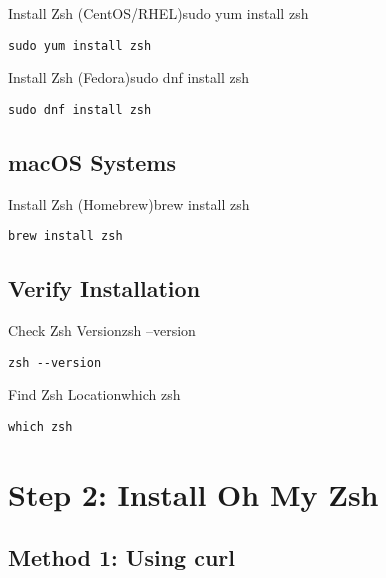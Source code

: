 \documentclass{article}
\begin{document}
\begin{clickablecode}{Install Zsh (CentOS/RHEL)}{sudo yum install zsh}
\begin{lstlisting}
sudo yum install zsh
\end{lstlisting}
\end{clickablecode}

\begin{clickablecode}{Install Zsh (Fedora)}{sudo dnf install zsh}
\begin{lstlisting}
sudo dnf install zsh
\end{lstlisting}
\end{clickablecode}

\subsection{macOS Systems}

\begin{clickablecode}{Install Zsh (Homebrew)}{brew install zsh}
\begin{lstlisting}
brew install zsh
\end{lstlisting}
\end{clickablecode}

\subsection{Verify Installation}

\begin{clickablecode}{Check Zsh Version}{zsh --version}
\begin{lstlisting}
zsh --version
\end{lstlisting}
\end{clickablecode}

\begin{clickablecode}{Find Zsh Location}{which zsh}
\begin{lstlisting}
which zsh
\end{lstlisting}
\end{clickablecode}

\section{Step 2: Install Oh My Zsh}

\subsection{Method 1: Using curl}
\end{document}
